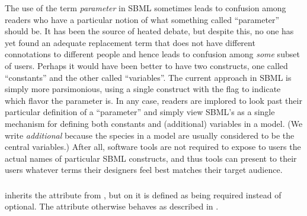 The use of the term \emph{parameter} in SBML sometimes leads to
confusion among readers who have a particular notion of what
something called ``parameter'' should be.  It has been the source
of heated debate, but despite this, no one has yet found an
adequate replacement term that does not have different
connotations to different people and hence leads to confusion
among \emph{some} subset of users.  Perhaps it would have been
better to have two constructs, one called ``constants'' and the
other called ``variables''.  The current approach in SBML is
simply more parsimonious, using a single \Parameter construct with
the  flag  to indicate which flavor the
parameter is.  In any case, readers are implored to look past
their particular definition of a ``parameter'' and simply view
SBML's \Parameter as a single mechanism for defining both
constants and (additional) variables in a model.  (We write
\emph{additional} because the species in a model are usually
considered to be the central variables.)  After all, software
tools are not required to expose to users the actual names of
particular SBML constructs, and thus tools can present to their
users whatever terms their designers feel best matches their
target audience.


\subsubsection{}

{\Parameter inherits the  attribute from \SBase, but on \Parameter it is defined as being required instead of optional.  The attribute otherwise behaves as described in .}


